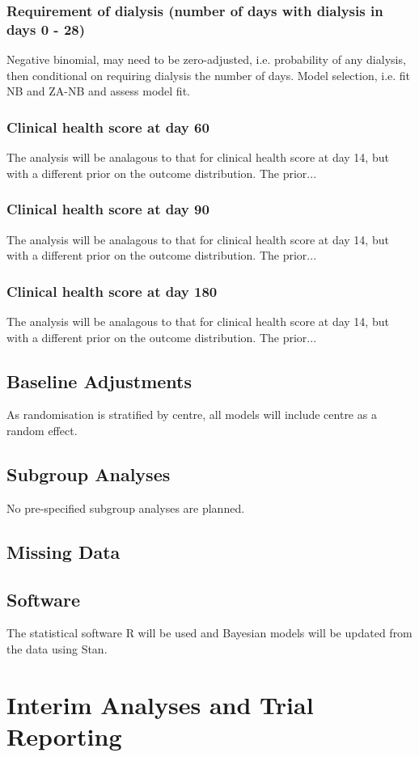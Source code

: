 \documentclass[11pt,parskip=half-]{scrartcl}
\begin{document}
\subsubsection{Requirement of dialysis (number of days with dialysis in days 0 - 28)}
Negative binomial, may need to be zero-adjusted, i.e. probability of any dialysis, then conditional on requiring dialysis the number of days. Model selection, i.e. fit NB and ZA-NB and assess model fit.

\subsubsection{Clinical health score at day 60}
The analysis will be analagous to that for clinical health score at day 14, but with a different prior on the outcome distribution. The prior...

\subsubsection{Clinical health score at day 90}
The analysis will be analagous to that for clinical health score at day 14, but with a different prior on the outcome distribution. The prior...

\subsubsection{Clinical health score at day 180}
The analysis will be analagous to that for clinical health score at day 14, but with a different prior on the outcome distribution. The prior...

\subsection{Baseline Adjustments}
As randomisation is stratified by centre, all models will include centre as a random effect.

\subsection{Subgroup Analyses}
No pre-specified subgroup analyses are planned.

\subsection{Missing Data}


\subsection{Software}
The statistical software R will be used and Bayesian models will be updated from the data using Stan.

\clearpage

\section{Interim Analyses and Trial Reporting}
\end{document}
